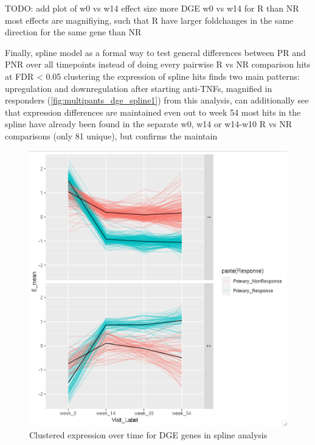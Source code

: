\begin{outline}
\1 TODO: add plot of w0 vs w14 effect size
    \2 more DGE w0 vs w14 for R than NR
    \2 most effects are magnifiying, such that R have larger foldchanges in the same direction for the same gene than NR

\1 Finally, spline model as a formal way to test general differences between PR and PNR over all timepoints
    \2 instead of doing every pairwise R vs NR comparison
     hits at FDR < 0.05
    \2 clustering the expression of spline hits finds two main patterns: upregulation and downregulation after starting anti-TNFs, magnified in responders (\autoref{fig:multipants_dge_spline1})
    \2 from this analysis, can additionally see that expression differences are maintained even out to week 54
    \2 most hits in the spline have already been found in the separate w0, w14 or w14-w10 R vs NR comparisons (only 81 unique), but confirms the maintain

\begin{figure}
    \centering
    \includegraphics[width=1.0\textwidth,page=1]{mainmatter/figures/chapter_04/Screenshot 2020-08-06 at 16.09.43.png}
    \caption{Clustered expression over time for DGE genes in spline analysis}
    \label{fig:multipants_dge_spline1}
\end{figure}
    

\end{outline}
